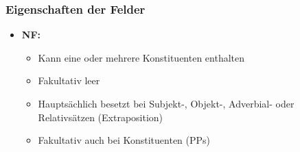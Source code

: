 \begin{frame}
\frametitle{Eigenschaften der Felder}

\begin{itemize}
	\item \textbf{NF:}
	\begin{itemize}
		\item Kann eine oder mehrere Konstituenten enthalten
		\item Fakultativ leer
		\item Hauptsächlich besetzt bei Subjekt-, Objekt-, Adverbial- oder Relativsätzen (Extraposition)
		\item Fakultativ auch bei  Konstituenten (PPs)
	\end{itemize}

\begin{table}
\centering
{}
\end{table}

\end{itemize}

\end{frame}


